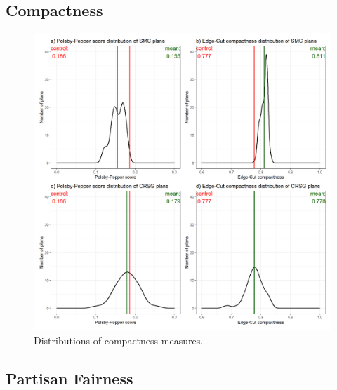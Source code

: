\subsection{Compactness}
\begin{figure}
    \centering
    \includegraphics[width=\textwidth]{img/compact.density.png}
    \caption{Distributions of compactness measures.}
    \label{fig:compact.density}
\end{figure}


\subsection{Partisan Fairness}


